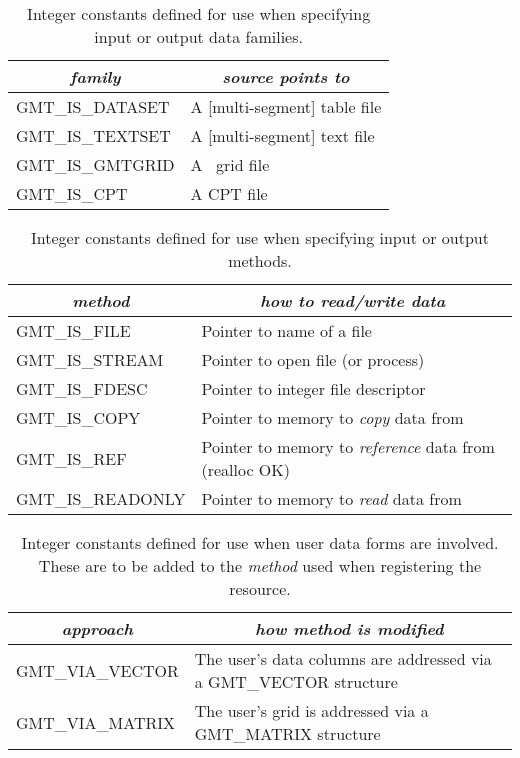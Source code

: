\documentclass{report}
\begin{document}
\begin{table}[h]
\small
\centering
\begin{tabular}{|l|l|} \hline
\multicolumn{1}{|c|}{\emph{family}} & \multicolumn{1}{c|}{\emph{source points to}} \\ \hline
GMT\_IS\_DATASET		&       A [multi-segment] table file \\ \hline
GMT\_IS\_TEXTSET		&       A [multi-segment] text file \\ \hline
GMT\_IS\_GMTGRID		&       A \GMT\ grid file \\ \hline
GMT\_IS\_CPT			&       A CPT file \\ \hline
\end{tabular}
\caption{Integer constants defined for use when specifying input or output data families.}
\label{tbl:family}
\end{table}


\begin{table}[h]
\small
\centering
\begin{tabular}{|l|l|} \hline
\multicolumn{1}{|c|}{\emph{method}} & \multicolumn{1}{c|}{\emph{how to read/write data}} \\ \hline
GMT\_IS\_FILE		&       Pointer to name of a file \\ \hline
GMT\_IS\_STREAM		&       Pointer to open file (or process)  \\ \hline
GMT\_IS\_FDESC		&       Pointer to integer file descriptor \\ \hline
GMT\_IS\_COPY		&       Pointer to memory to \emph{copy} data from \\ \hline
GMT\_IS\_REF		&       Pointer to memory to \emph{reference} data from (realloc OK) \\ \hline
GMT\_IS\_READONLY	&       Pointer to memory to \emph{read} data from \\ \hline
\end{tabular}
\caption{Integer constants defined for use when specifying input or output methods.}
\label{tbl:methods}
\end{table}

\begin{table}[h]
\small
\centering
\begin{tabular}{|l|l|} \hline
\multicolumn{1}{|c|}{\emph{approach}} & \multicolumn{1}{c|}{\emph{how method is modified}} \\ \hline
GMT\_VIA\_VECTOR	&       The user's data columns are addressed via a GMT\_VECTOR structure \\ \hline
GMT\_VIA\_MATRIX	&       The user's grid is addressed via a GMT\_MATRIX structure \\ \hline
\end{tabular}
\caption{Integer constants defined for use when user data forms are involved.  These are to be added
to the \emph{method} used when registering the resource.}
\label{tbl:via}
\end{table}
\end{document}
